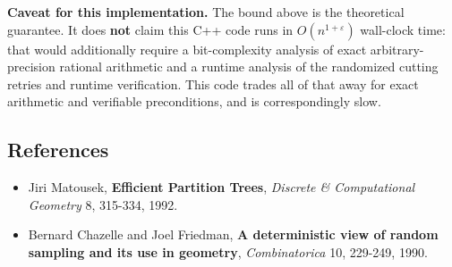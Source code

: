 \documentclass[
  11pt,
]{article}
\providecommand{\tightlist}{%
  \setlength{\itemsep}{0pt}\setlength{\parskip}{0pt}}
\begin{document}
\textbf{Caveat for this implementation.} The bound above is the
theoretical guarantee. It does \textbf{not} claim this C++ code runs
in \(O(n^{1+\varepsilon})\) wall-clock time: that would additionally
require a bit-complexity analysis of exact arbitrary-precision rational arithmetic
and a runtime analysis of the randomized cutting retries and runtime
verification. This code trades all of that away for exact arithmetic and
verifiable preconditions, and is correspondingly slow.

\hypertarget{references}{%
\subsection{References}\label{references}}

\begin{itemize}
\tightlist
\item
  Jiri Matousek, \textbf{Efficient Partition Trees}, \emph{Discrete \&
  Computational Geometry} 8, 315-334, 1992.
\item
  Bernard Chazelle and Joel Friedman, \textbf{A deterministic view of
  random sampling and its use in geometry}, \emph{Combinatorica} 10,
  229-249, 1990.
\end{itemize}
\end{document}
